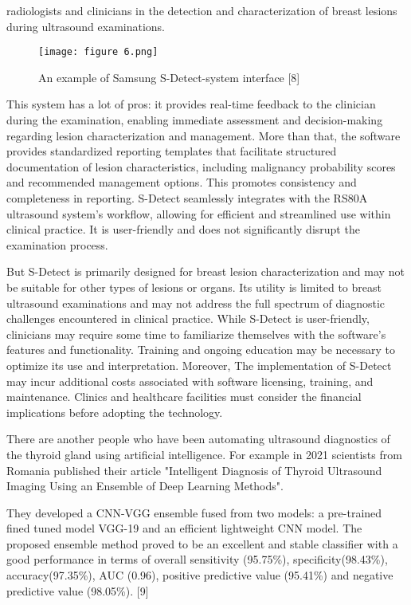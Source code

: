 \documentclass{article}
\begin{document}
\pagestyle{fancy}
\fancyfoot[C]{\Large \textbf{\thepage}}
\renewcommand{\headrulewidth}{0pt}
\noindent %
radiologists and clinicians in the detection and characterization of breast lesions during ultrasound examinations.
\begin{figure}[h]
    \centering
    \texttt{[image: figure 6.png]} %
    \caption{An example of Samsung S-Detect-system interface [8]}
\end{figure}

\par This system has a lot of pros: it provides real-time feedback to the clinician during the examination, enabling
immediate assessment and decision-making regarding
lesion characterization and management. More than that,
the software provides standardized reporting templates
that facilitate structured documentation of lesion characteristics, including malignancy probability scores and recommended management options. This promotes consistency and completeness in reporting. 
S-Detect seamlessly integrates with the RS80A ultrasound system’s workflow,
allowing for efficient and streamlined use within clinical
practice. It is user-friendly and does not significantly
disrupt the examination process.

\par But S-Detect is primarily designed for breast lesion
characterization and may not be suitable for other types
of lesions or organs. Its utility is limited to breast
ultrasound examinations and may not address the full
spectrum of diagnostic challenges encountered in clinical practice. While S-Detect is user-friendly, clinicians
may require some time to familiarize themselves with
the software’s features and functionality. Training and
ongoing education may be necessary to optimize its
use and interpretation. Moreover, The implementation
of S-Detect may incur additional costs associated with
software licensing, training, and maintenance. Clinics
and healthcare facilities must consider the financial implications before adopting the technology.

\par There are another people who have been automating
ultrasound diagnostics of the thyroid gland using artificial intelligence. For example in 2021 scientists from
Romania published their article "Intelligent Diagnosis of
Thyroid Ultrasound Imaging Using an Ensemble of Deep
Learning Methods".

\par They developed a CNN-VGG ensemble fused from two
models: a pre-trained fined tuned model VGG-19 and an
efficient lightweight CNN model. The proposed ensemble
method proved to be an excellent and stable classifier
with a good performance in terms of overall sensitivity
(95.75\%), specificity(98.43\%), accuracy(97.35\%), 
\columnbreak AUC (0.96), positive predictive value (95.41\%) and negative predictive value (98.05\%). [9]
\end{document}
